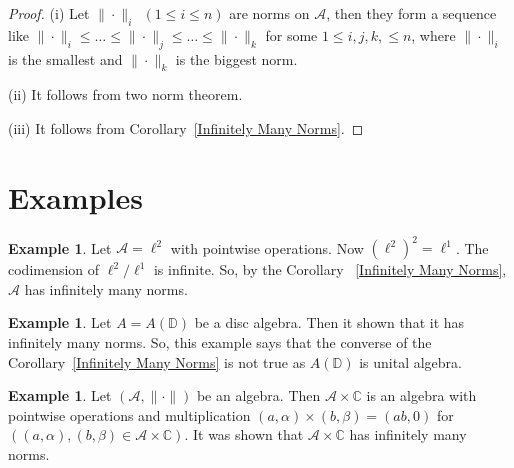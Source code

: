 \documentclass{amsart}
\theoremstyle{definition}
\newtheorem{exam}[thm]{Example}
\numberwithin{equation}{section}
\begin{document}
\begin{proof}
	(i) Let  $\| \cdot \|_i \ \ (1 \leq i \leq n)$ are norms on $\mathcal{A}$, then they form a sequence like $ \| \cdot \|_i \leq \ldots \leq  \| \cdot \|_j  \leq \ldots \leq \| \cdot \|_k$ for some $1 \leq i, j, k, \leq n$, where $\| \cdot \|_i$ is the smallest and $\| \cdot \|_k$ is the biggest norm.

	(ii) It follows from two norm theorem.
	
	(iii) It follows from Corollary~\ref{Infinitely Many Norms}.
\end{proof}


\section{Examples}
\begin{exam}
	Let $\mathcal{A} = \ell^2$ with pointwise operations. Now $(\ell^2)^2= \ell^1$. The codimension of $\ell^2/ \ell^1$ is infinite. So, by the Corollary~ \ref{Infinitely Many Norms}, $\mathcal{A}$ has infinitely many norms.
\end{exam}

\begin{exam}
	Let $A = A(\mathbb{D})$ be a disc algebra. Then it shown that it has infinitely many norms. So, this example says that the converse of the Corollary~\ref{Infinitely Many Norms} is not true as $A(\mathbb{D})$ is unital algebra.
\end{exam}

\begin{exam}
	Let $(\mathcal{A}, \| \cdot \|)$ be an algebra. Then $\mathcal{A} \times \mathbb{C}$ is an algebra with pointwise operations and multiplication $(a, \alpha) \times (b, \beta) = (ab,0)$ for $((a,\alpha), (b, \beta) \in \mathcal{A} \times \mathbb{C})$. It was shown that $\mathcal{A} \times \mathbb{C}$ has infinitely many norms.
\end{exam}
\end{document}
